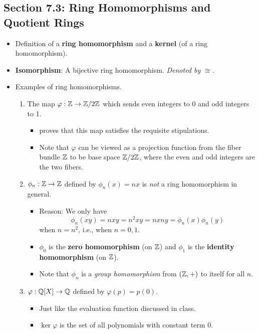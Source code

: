 \documentclass[../notes.tex]{subfiles}
\begin{document}
\subsection*{Section 7.3: Ring Homomorphisms and Quotient Rings}
\begin{itemize}
    \item {}Definition of a \textbf{ring homomorphism} and a \textbf{kernel} (of a ring homomorphism).
    \item \textbf{Isomorphism}: A bijective ring homomorphism. \emph{Denoted by} $\bm{\cong}$.
    \item Examples of ring homomorphisms.
    \begin{enumerate}
        \item The map $\varphi:\mathbb{Z}\to\mathbb{Z}/2\mathbb{Z}$ which sends even integers to 0 and odd integers to 1.
        \begin{itemize}
            \item \textcite{bib:DummitFoote} proves that this map satisfies the requisite stipulations.
            \item Note that $\varphi$ can be viewed as a projection function from the fiber bundle $\mathbb{Z}$ to be base space $\mathbb{Z}/2\mathbb{Z}$, where the even and odd integers are the two fibers.
        \end{itemize}
        \item $\phi_n:\mathbb{Z}\to\mathbb{Z}$ defined by $\phi_n(x)=nx$ is \emph{not} a ring homomorphism in general.
        \begin{itemize}
            \item Reason: We only have
            \begin{equation*}
                \phi_n(xy) = nxy = n^2xy = nxny = \phi_n(x)\phi_n(y)
            \end{equation*}
            when $n=n^2$, i.e., when $n=0,1$.
            \item $\phi_0$ is the \textbf{zero homomorphism} (on $\mathbb{Z}$) and $\phi_1$ is the \textbf{identity homomorphism} (on $\mathbb{Z}$).
            \item Note that $\phi_n$ is a \emph{group homomorphism} from $(\mathbb{Z},+)$ to itself for all $n$.
        \end{itemize}
        \item $\varphi:\mathbb{Q}[X]\to\mathbb{Q}$ defined by $\varphi(p)=p(0)$.
        \begin{itemize}
            \item Just like the evaluation function discussed in class.
            \item $\ker\varphi$ is the set of all polynomials with constant term 0.

\end{itemize}
\end{enumerate}
\end{itemize}
\end{document}
